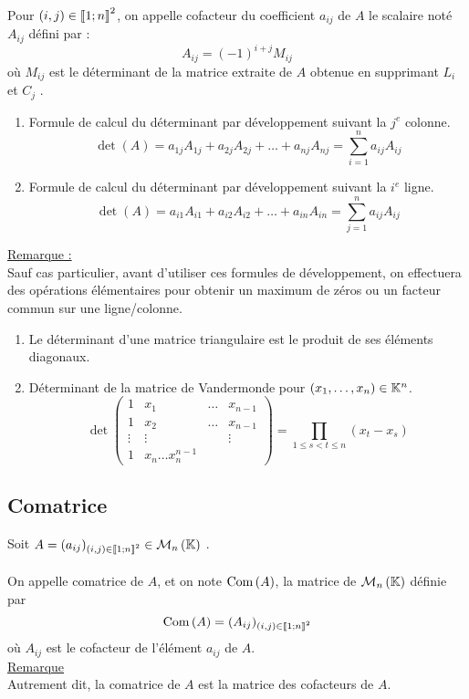 \begin{defprop}
    Pour \((i, j) \in  \left\llbracket1;n\right\rrbracket^2\), on appelle cofacteur du coefficient \(a_{ij}\) de \(A\) le scalaire noté \(A_{ij}\) défini par :
    \[A_{ij} = (-1)^{i+j} M_{ij}\]
    où \(M_{ij}\) est le déterminant de la matrice extraite de \(A\) obtenue en supprimant \(L_i\) et \(C_j\) .
    \begin{enumerate}
        \item Formule de calcul du déterminant par développement suivant la \(j^e\) colonne.
        \[\det(A) = a_{1j} A_{1j} + a_{2j} A_{2j} + \dots + a_{nj} A_{nj} = \sum^n_{i=1} a_{ij} A_{ij}\] 
        \item Formule de calcul du déterminant par développement suivant la \(i^e\) ligne.
        \[\det(A) = a_{i1}A_{i1} + a_{i2}A_{i2} + \dots + a_{in}A_{in} = \sum^n_{j=1} a_{ij} A_{ij} \]
    \end{enumerate}
    \underline{Remarque :}\\
    Sauf cas particulier, avant d’utiliser ces formules de développement, on effectuera des opérations élémentaires pour obtenir un maximum de zéros ou un facteur commun sur une ligne/colonne.
\end{defprop}

\begin{defprop}
    \begin{enumerate}
        \item Le déterminant d’une matrice triangulaire est le produit de ses éléments diagonaux.
        \item Déterminant de la matrice de Vandermonde pour \((x_1, \dots  , x_n) \in  \mathbb{K}^n \).
        \[\det\begin{pmatrix}
            1 & x_1 & \dots & x_{n-1}\\
            1 & x_2 & \dots & x_{n-1}\\
            \vdots & \vdots &&\vdots \\
            1 & x_n \dots  x^{n-1}_n 
            \end{pmatrix} = \prod_{1\leq s<t\leq n}(x_t - x_s)
        \]
    \end{enumerate}
\end{defprop}

\subsection{Comatrice}
\begin{defi}
    Soit \(A = (a_{ij} )_{(i,j)\in \interventierii{1}{n}^2} \in  \M{n}\) .\\~\\
    On appelle comatrice de \(A\), et on note \(\operatorname{Com}\left(A\right)\), la matrice de \(\M{n}\) définie par 
    \[\operatorname{Com}\left(A\right) = (A_{ij} )_{(i,j) \in \left\llbracket1;n\right\rrbracket^2}\]
    où \(A_{ij}\) est le cofacteur de l’élément \(a_{ij}\) de \(A\).\\
    \underline{Remarque}\\
    Autrement dit, la comatrice de \(A\) est la matrice des cofacteurs de \(A\).
\end{defi}

